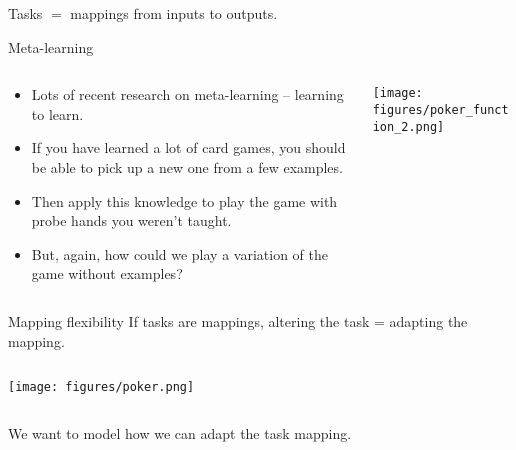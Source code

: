 \documentclass{beamer}
\begin{document}
\begin{frame}[standout]
Tasks \(\bm =\) mappings from inputs to outputs. 
\end{frame}

\begin{frame}{Meta-learning}
\begin{columns}
\begin{column}{0.5\textwidth}

\begin{itemize}
    \item Lots of recent research on meta-learning -- learning to learn.
    \item If you have learned a lot of card games, you should be able to pick up a new one from a few examples.
    \item Then apply this knowledge to play the game with probe hands you weren't taught. 
    \item But, again, how could we play a variation of the game without examples? 
\end{itemize}
\end{column}

\begin{column}{0.5\textwidth}
\texttt{[image: figures/poker\_function\_2.png]}
\end{column}
\end{columns}
\end{frame}

\begin{frame}{Mapping flexibility}
If tasks are mappings, altering the task = adapting the mapping. 
\begin{columns}
\begin{column}{0.5\textwidth}
\vspace{2em}
\texttt{[image: figures/poker.png]}
\end{column}
\begin{column}{0.5\textwidth}
\vspace{2em}
\end{column}
\end{columns}
\end{frame}

\begin{frame}[standout]
We want to model how we can adapt the task mapping.
\end{frame}
\end{document}

